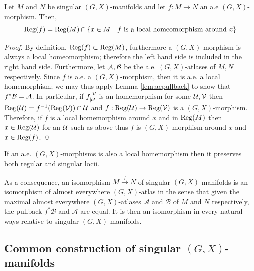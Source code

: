 					
                \begin{lem}{}\label{lem:GX_sing_homeo_reg}
						 Let $M$ and $N$ be singular $(G,X)$-manifolds and let $f:M\rightarrow N$ an a.e $(G,X)$-morphism. Then,
					$$\mathrm{Reg}(f)=\mathrm{Reg}(M)\cap \{x\in M  ~|~ f \text{ is a local homeomorphism around }x\}$$
					\end{lem}
					\begin{proof}
					By definition, $\mathrm{Reg}(f)\subset \mathrm{Reg}(M)$, furthermore a $(G,X)$-morphism is always a local homeomorphism; therefore the left hand side is included in the right hand side. Furthermore, let $\mathcal A,\mathcal B$ be the a.e. $(G,X)$-atlases of $M,N$ respectively. Since $f$ is a.e. a $(G,X)$-morphism, then it is a.e. a local homemorphism; we may thus apply Lemma \ref{lem:aepullback} to show that $f^*\mathcal B = \mathcal A$. In particular, if $f_{|\mathcal{U}}^{|\mathcal V}$ is an homemorphism for some $\mathcal{U},\mathcal V$ then 
					$\mathrm{Reg}(\mathcal{U}) = f^{-1}(\mathrm{Reg}(\mathcal V))\cap \mathcal{U}$ and $f:\mathrm{Reg}(\mathcal{U})\rightarrow \mathrm{Reg}(\mathcal V)$ is a $(G,X)$-morphism. 
					Therefore, if $f$ is a local homemorphism around $x$ and in $\mathrm{Reg}(M)$ then $x\in \mathrm{Reg}(\mathcal{U})$ for an $\mathcal{U}$ such as above thus $f$ is $(G,X)$-morphism around $x$ and $x\in \mathrm{Reg}(f)$.
					\qed\end{proof}


					\begin{cor}\label{cor:morphisms_also_local_homemorphism} If an a.e. $(G,X)$-morphisms  is also a local homemorphism then it preserves both regular and singular locii.
					\end{cor}
					
					\begin{rem}\label{rem:consequence_isomorphism_singular_manifolds} As a consequence, 
					 an isomorphism $M\xrightarrow{f} N$ of singular $(G,X)$-manifolds is an isomorphism of almost everywhere $(G,X)$-atlas in the sense that given the maximal almost everywhere $(G,X)$-atlases $\mathcal A$ and $\mathcal B$ of $M$ and $N$ respectively, the pullback $f^*\mathcal B$ and $\mathcal A$ are equal. It is then an isomorphism in every natural ways relative to singular $(G,X)$-manifolds.
					 
					 
                    \end{rem}

\subsection{Common construction of  singular $(G,X)$-manifolds}
\label{sec:construction_example}

